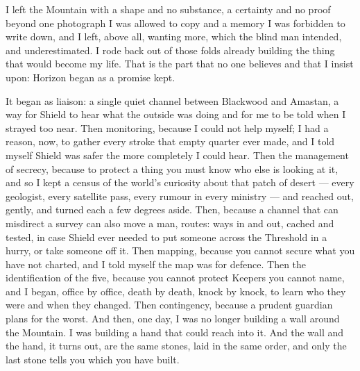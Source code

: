 I left the Mountain with a shape and no substance, a certainty and no proof beyond one photograph I was allowed to copy and a memory I was forbidden to write down, and I left, above all, wanting more, which the blind man intended, and underestimated. I rode back out of those folds already building the thing that would become my life. That is the part that no one believes and that I insist upon: Horizon began as a promise kept.\par

It began as liaison: a single quiet channel between Blackwood and Amastan, a way for Shield to hear what the outside was doing and for me to be told when I strayed too near. Then monitoring, because I could not help myself; I had a reason, now, to gather every stroke that empty quarter ever made, and I told myself Shield was safer the more completely I could hear. Then the management of secrecy, because to protect a thing you must know who else is looking at it, and so I kept a census of the world's curiosity about that patch of desert --- every geologist, every satellite pass, every rumour in every ministry --- and reached out, gently, and turned each a few degrees aside. Then, because a channel that can misdirect a survey can also move a man, routes: ways in and out, cached and tested, in case Shield ever needed to put someone across the Threshold in a hurry, or take someone off it. Then mapping, because you cannot secure what you have not charted, and I told myself the map was for defence. Then the identification of the five, because you cannot protect Keepers you cannot name, and I began, office by office, death by death, knock by knock, to learn who they were and when they changed. Then contingency, because a prudent guardian plans for the worst. And then, one day, I was no longer building a wall around the Mountain. I was building a hand that could reach into it. And the wall and the hand, it turns out, are the same stones, laid in the same order, and only the last stone tells you which you have built.\par


